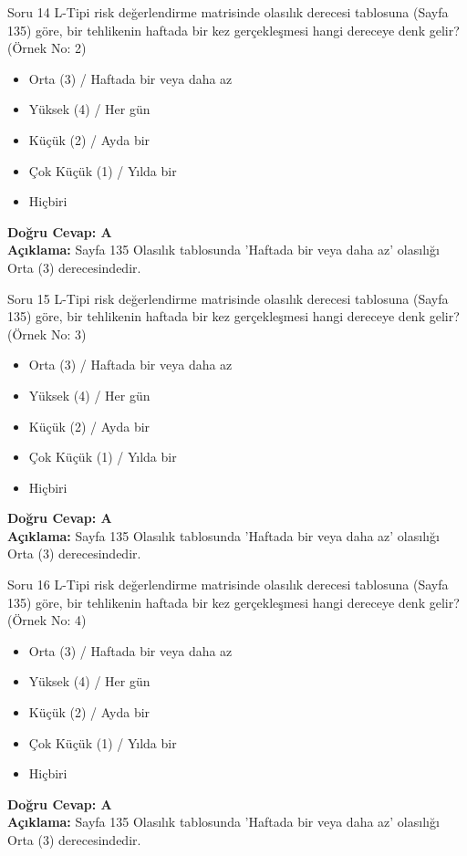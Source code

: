 \documentclass[12pt,a4paper]{article}
\begin{document}
\begin{testcard}{Soru 14}
    L-Tipi risk değerlendirme matrisinde olasılık derecesi tablosuna (Sayfa 135) göre, bir tehlikenin haftada bir kez gerçekleşmesi hangi dereceye denk gelir? (Örnek No: 2)
    \begin{itemize}
        \item[A)] Orta (3) / Haftada bir veya daha az
        \item[B)] Yüksek (4) / Her gün
        \item[C)] Küçük (2) / Ayda bir
        \item[D)] Çok Küçük (1) / Yılda bir
        \item[E)] Hiçbiri
    \end{itemize}
    \tcblower
    \textbf{Doğru Cevap: A} \\
    \textbf{Açıklama:} Sayfa 135 Olasılık tablosunda 'Haftada bir veya daha az' olasılığı Orta (3) derecesindedir.
\end{testcard}

\begin{testcard}{Soru 15}
    L-Tipi risk değerlendirme matrisinde olasılık derecesi tablosuna (Sayfa 135) göre, bir tehlikenin haftada bir kez gerçekleşmesi hangi dereceye denk gelir? (Örnek No: 3)
    \begin{itemize}
        \item[A)] Orta (3) / Haftada bir veya daha az
        \item[B)] Yüksek (4) / Her gün
        \item[C)] Küçük (2) / Ayda bir
        \item[D)] Çok Küçük (1) / Yılda bir
        \item[E)] Hiçbiri
    \end{itemize}
    \tcblower
    \textbf{Doğru Cevap: A} \\
    \textbf{Açıklama:} Sayfa 135 Olasılık tablosunda 'Haftada bir veya daha az' olasılığı Orta (3) derecesindedir.
\end{testcard}

\begin{testcard}{Soru 16}
    L-Tipi risk değerlendirme matrisinde olasılık derecesi tablosuna (Sayfa 135) göre, bir tehlikenin haftada bir kez gerçekleşmesi hangi dereceye denk gelir? (Örnek No: 4)
    \begin{itemize}
        \item[A)] Orta (3) / Haftada bir veya daha az
        \item[B)] Yüksek (4) / Her gün
        \item[C)] Küçük (2) / Ayda bir
        \item[D)] Çok Küçük (1) / Yılda bir
        \item[E)] Hiçbiri
    \end{itemize}
    \tcblower
    \textbf{Doğru Cevap: A} \\
    \textbf{Açıklama:} Sayfa 135 Olasılık tablosunda 'Haftada bir veya daha az' olasılığı Orta (3) derecesindedir.
\end{testcard}
\end{document}
